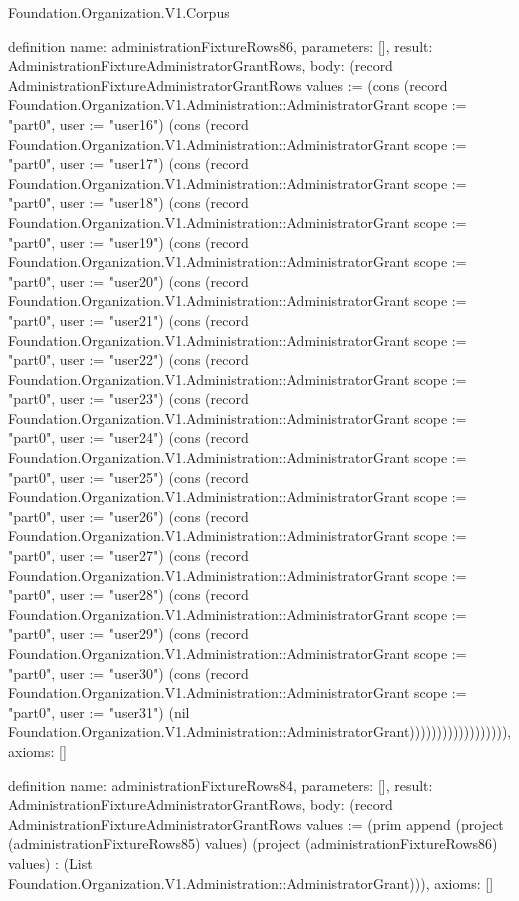 \begin{lexlean}{Foundation.Organization.V1.Corpus}
\begin{semanticmodule}
definition{
  name: administrationFixtureRows86,
  parameters: [],
  result: AdministrationFixtureAdministratorGrantRows,
  body: (record AdministrationFixtureAdministratorGrantRows {values := (cons (record Foundation.Organization.V1.Administration::AdministratorGrant {scope := "part0", user := "user16"}) (cons (record Foundation.Organization.V1.Administration::AdministratorGrant {scope := "part0", user := "user17"}) (cons (record Foundation.Organization.V1.Administration::AdministratorGrant {scope := "part0", user := "user18"}) (cons (record Foundation.Organization.V1.Administration::AdministratorGrant {scope := "part0", user := "user19"}) (cons (record Foundation.Organization.V1.Administration::AdministratorGrant {scope := "part0", user := "user20"}) (cons (record Foundation.Organization.V1.Administration::AdministratorGrant {scope := "part0", user := "user21"}) (cons (record Foundation.Organization.V1.Administration::AdministratorGrant {scope := "part0", user := "user22"}) (cons (record Foundation.Organization.V1.Administration::AdministratorGrant {scope := "part0", user := "user23"}) (cons (record Foundation.Organization.V1.Administration::AdministratorGrant {scope := "part0", user := "user24"}) (cons (record Foundation.Organization.V1.Administration::AdministratorGrant {scope := "part0", user := "user25"}) (cons (record Foundation.Organization.V1.Administration::AdministratorGrant {scope := "part0", user := "user26"}) (cons (record Foundation.Organization.V1.Administration::AdministratorGrant {scope := "part0", user := "user27"}) (cons (record Foundation.Organization.V1.Administration::AdministratorGrant {scope := "part0", user := "user28"}) (cons (record Foundation.Organization.V1.Administration::AdministratorGrant {scope := "part0", user := "user29"}) (cons (record Foundation.Organization.V1.Administration::AdministratorGrant {scope := "part0", user := "user30"}) (cons (record Foundation.Organization.V1.Administration::AdministratorGrant {scope := "part0", user := "user31"}) (nil Foundation.Organization.V1.Administration::AdministratorGrant)))))))))))))))))}),
  axioms: []
}

definition{
  name: administrationFixtureRows84,
  parameters: [],
  result: AdministrationFixtureAdministratorGrantRows,
  body: (record AdministrationFixtureAdministratorGrantRows {values := (prim append (project (administrationFixtureRows85) values) (project (administrationFixtureRows86) values) : (List Foundation.Organization.V1.Administration::AdministratorGrant))}),
  axioms: []
}


\end{semanticmodule}
\end{lexlean}
